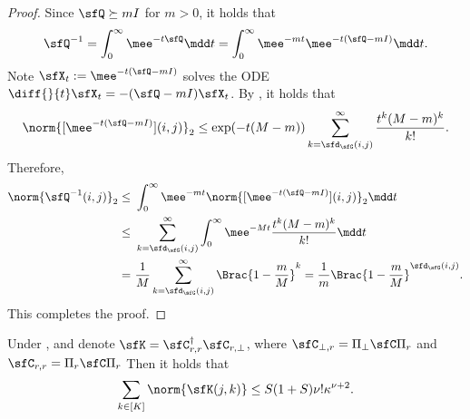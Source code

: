 \documentclass[11pt]{article}
\begin{document}
\begin{proof}
Since $\sfQ\succeq m I $ for $m>0$, it holds that
\[
    \sfQ^{-1} = \int_0^\infty \mee^{-t \sfQ} \mdd t = \int_0^\infty \mee^{-mt} \mee^{-t (\sfQ-mI)} \mdd t.
\]
Note $\sfX_t := \mee^{-t(\sfQ-mI)}$ solves the ODE $ \diff{}{t} \sfX_t = - (\sfQ-mI) \sfX_t $.
By , it holds that 
\[
    \norm{ [\mee^{-t(\sfQ-mI)}] (i,j) }_2 \le \exp(-t(M-m)) \sum_{k=\sfd_\sfG(i,j)}^\infty \frac{t^k (M-m)^k}{k!}.
\]
Therefore, 
\begin{align*}
    \norm{ \sfQ^{-1}(i,j) }_2 \le~& \int_0^\infty \mee^{-mt} \norm{ [\mee^{-t(\sfQ-mI)}] (i,j) }_2 \mdd t \\
    \le~& \sum_{k=\sfd_\sfG(i,j)}^\infty \int_0^\infty \mee^{-Mt} \frac{t^k (M-m)^k}{k!} \mdd t \\
    =~& \frac{1}{M} \sum_{k=\sfd_\sfG(i,j)}^\infty \Brac{ 1 - \frac{m}{M} }^k = \frac{1}{m} \Brac{ 1 - \frac{m}{M} }^{\sfd_\sfG(i,j)}. 
\end{align*}
This completes the proof.
\end{proof}



\begin{lem}
\label{lem:Kl1Bound}
Under , and denote $\sfK = \sfC_{r,r}^\dag \sfC_{r,\bot}$, where $\sfC_{\bot,r} = \Pi_{\bot} \sfC \Pi_{r}$ and $\sfC_{r,r} = \Pi_{r} \sfC \Pi_{r}$
Then it holds that 
\[
    \sum_{k\in[K]} \norm{ \sfK(j,k) } \le S(1+S) \nu! \kappa^{\nu+2}. 
\]
\end{lem}
\end{document}

